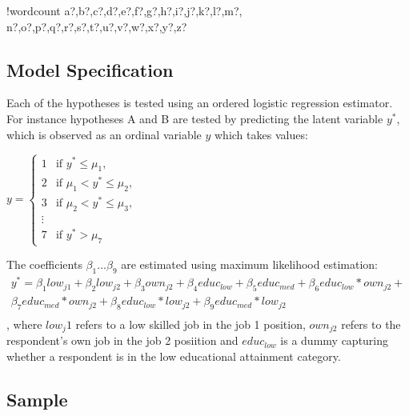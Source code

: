 \documentclass{article}\usepackage[]{graphicx}\usepackage[]{color}
\newcounter{words}
\newenvironment{counted}{%
\setcounter{words}{0}
\SearchList!{wordcount}{\stepcounter{words}}
{a?,b?,c?,d?,e?,f?,g?,h?,i?,j?,k?,l?,m?,
n?,o?,p?,q?,r?,s?,t?,u?,v?,w?,x?,y?,z?}
\UndoBoundary{'}
\SearchOrder{p;}}{%
\StopSearching}
\begin{document}
\begin{counted}
\subsection{Model Specification}

Each of the hypotheses is tested using an ordered logistic regression estimator. For instance hypotheses A and B are tested by predicting the latent variable $y^*$, which is observed as an ordinal variable $y$ which takes values:

\begin{math} y= \begin{cases}
1 & \text{if } y^* \le \mu_1, \\
2 & \text{if } \mu_1<y^* \le \mu_2, \\
3 & \text{if } \mu_2 <y^* \le \mu_3, \\
\vdots \\
7 & \text{if }  y^* > \mu_{7}
\end{cases}\end{math}

The coefficients $ \beta_1... \beta_9$ are estimated using maximum likelihood estimation:
\begin{multline}
y^* =  \beta_1 low_{j1} + \beta_2 low_{j2} + \beta_3 own_{j2} + \beta_4 educ_{low} + 
\beta_5 educ_{med} + 
\beta_6 educ_{low} * own_{j2} + \\
\beta_7 educ_{med} * own_{j2} + 
\beta_8 educ_{low} * low_{j2} + 
\beta_9 educ_{med} * low_{j2} \\
\end{multline}
, where $low_j1$ refers to a low skilled job in the job 1 position, $own_{j2}$ refers to the respondent's own job in the job 2 posiition and $educ_{low}$ is a dummy capturing whether a respondent is in the low educational attainment category.

\subsection{Sample}


\end{counted}
\end{document}
